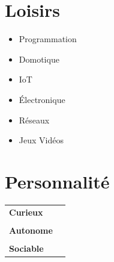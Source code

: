 \documentclass[a4paper, 12pt]{article}
\begin{document}
\begin{minipage}[t]{0.35\textwidth}
	\section*{\textcolor{sectioncolor}{Loisirs}}
	\begin{itemize}[leftmargin=0.5cm, label={\textcolor{itemcolor}{\faAngleRight}}]
		\item Programmation
		\item Domotique
		\item IoT
		\item Électronique
		\item Réseaux
		\item Jeux Vidéos
	\end{itemize}

	\section*{\textcolor{sectioncolor}{Personnalité}}
	\begin{tabular}{ m{} m{} }
		\textbf{Curieux}  & \\ & \\
		\textbf{Autonome} & \\ & \\
		\textbf{Sociable} &
	\end{tabular}

\end{minipage}

\vspace{-0.3cm}
\end{document}
